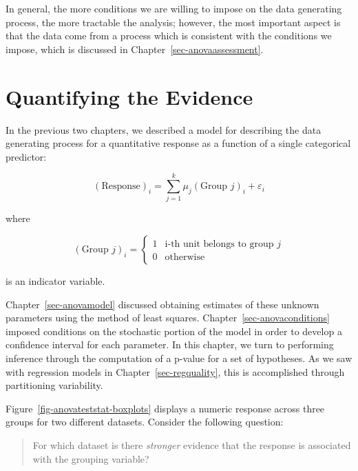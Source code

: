\documentclass[
  letterpaper,
  DIV=11,
  numbers=noendperiod]{scrreprt}
\theoremstyle{plain}
\theoremstyle{definition}
\theoremstyle{definition}
\theoremstyle{remark}
\begin{document}
In general, the more conditions we are willing to impose on the data
generating process, the more tractable the analysis; however, the most
important aspect is that the data come from a process which is
consistent with the conditions we impose, which is discussed in
Chapter~\ref{sec-anovaassessment}.

\hypertarget{sec-anovateststat}{%
\chapter{Quantifying the Evidence}\label{sec-anovateststat}}

In the previous two chapters, we described a model for describing the
data generating process for a quantitative response as a function of a
single categorical predictor:

\[(\text{Response})_i = \sum_{j = 1}^{k} \mu_j (\text{Group } j)_i + \varepsilon_i\]

where

\[(\text{Group } j)_i = \begin{cases} 1 & \text{i-th unit belongs to group } j \\ 0 & \text{otherwise} \end{cases}\]

is an indicator variable.

Chapter~\ref{sec-anovamodel} discussed obtaining estimates of these
unknown parameters using the method of least squares.
Chapter~\ref{sec-anovaconditions} imposed conditions on the stochastic
portion of the model in order to develop a confidence interval for each
parameter. In this chapter, we turn to performing inference through the
computation of a p-value for a set of hypotheses. As we saw with
regression models in Chapter~\ref{sec-regquality}, this is accomplished
through partitioning variability.

Figure~\ref{fig-anovateststat-boxplots} displays a numeric response
across three groups for two different datasets. Consider the following
question:

\begin{quote}
For which dataset is there \emph{stronger} evidence that the response is
associated with the grouping variable?
\end{quote}
\end{document}
